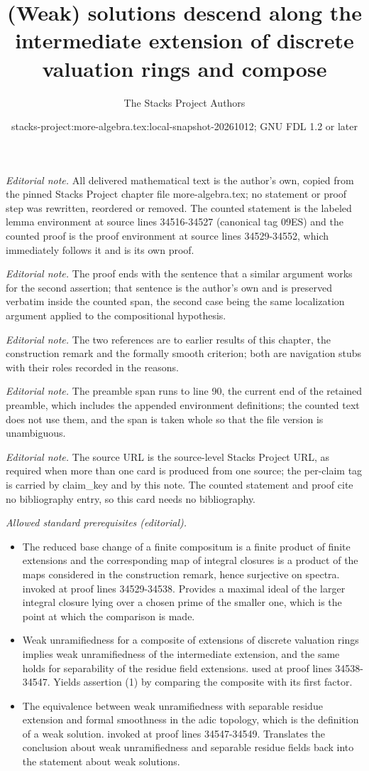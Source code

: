 \documentclass[10pt,a4paper]{amsart}
\title{(Weak) solutions descend along the intermediate extension of discrete valuation rings and compose}
\author{The Stacks Project Authors}
\date{stacks-project:more-algebra.tex:local-snapshot-20261012; GNU FDL 1.2 or later}
\theoremstyle{plain}
\theoremstyle{definition}
\theoremstyle{remark}
\numberwithin{equation}{subsection}
\begin{document}
\maketitle
\setcounter{subsection}{1}
\noindent\textit{Editorial note.} All delivered mathematical text is the author's own, copied from the pinned Stacks Project chapter file more-algebra.tex; no statement or proof step was rewritten, reordered or removed. The counted statement is the labeled lemma environment at source lines 34516-34527 (canonical tag 09ES) and the counted proof is the proof environment at source lines 34529-34552, which immediately follows it and is its own proof.\par\medskip
\noindent\textit{Editorial note.} The proof ends with the sentence that a similar argument works for the second assertion; that sentence is the author's own and is preserved verbatim inside the counted span, the second case being the same localization argument applied to the compositional hypothesis.\par\medskip
\noindent\textit{Editorial note.} The two references are to earlier results of this chapter, the construction remark and the formally smooth criterion; both are navigation stubs with their roles recorded in the reasons.\par\medskip
\noindent\textit{Editorial note.} The preamble span runs to line 90, the current end of the retained preamble, which includes the appended environment definitions; the counted text does not use them, and the span is taken whole so that the file version is unambiguous.\par\medskip
\noindent\textit{Editorial note.} The source URL is the source-level Stacks Project URL, as required when more than one card is produced from one source; the per-claim tag is carried by claim\_key and by this note. The counted statement and proof cite no bibliography entry, so this card needs no bibliography.\par\medskip
\noindent\textit{Allowed standard prerequisites (editorial).}\begin{itemize}
\item The reduced base change of a finite compositum is a finite product of finite extensions and the corresponding map of integral closures is a product of the maps considered in the construction remark, hence surjective on spectra. invoked at proof lines 34529-34538. Provides a maximal ideal of the larger integral closure lying over a chosen prime of the smaller one, which is the point at which the comparison is made.
\item Weak unramifiedness for a composite of extensions of discrete valuation rings implies weak unramifiedness of the intermediate extension, and the same holds for separability of the residue field extensions. used at proof lines 34538-34547. Yields assertion (1) by comparing the composite with its first factor.
\item The equivalence between weak unramifiedness with separable residue extension and formal smoothness in the adic topology, which is the definition of a weak solution. invoked at proof lines 34547-34549. Translates the conclusion about weak unramifiedness and separable residue fields back into the statement about weak solutions.
\end{itemize}\medskip
\end{document}
